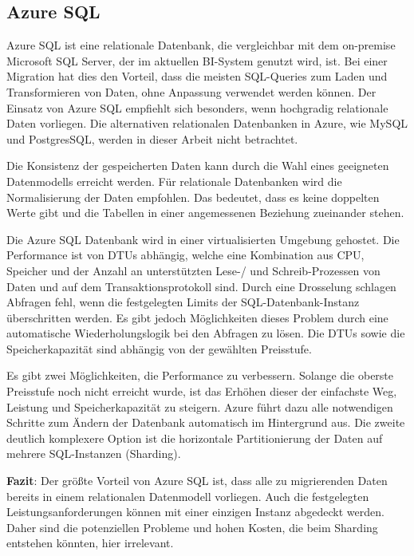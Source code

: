 \subsection{Azure SQL} \label{sec:grundlagen:azure_dienste:sql}
Azure SQL ist eine relationale Datenbank, die vergleichbar mit dem on-premise Microsoft SQL Server, der im aktuellen BI-System genutzt wird, ist. Bei einer Migration hat dies den Vorteil, dass die meisten SQL-Queries zum Laden und Transformieren von Daten, ohne Anpassung verwendet werden können. Der Einsatz von Azure SQL empfiehlt sich besonders, wenn hochgradig relationale Daten vorliegen. Die alternativen relationalen Datenbanken in Azure, wie MySQL und PostgresSQL, werden in dieser Arbeit nicht betrachtet.

Die Konsistenz der gespeicherten Daten kann durch die Wahl eines geeigneten Datenmodells erreicht werden. Für relationale Datenbanken wird die Normalisierung der Daten empfohlen. Das bedeutet, dass es keine doppelten Werte gibt und die Tabellen in einer angemessenen Beziehung zueinander stehen.

Die Azure SQL Datenbank wird in einer virtualisierten Umgebung gehostet. Die Performance ist von DTUs abhängig, welche eine Kombination aus CPU, Speicher und der Anzahl an unterstützten Lese-/ und Schreib-Prozessen von Daten und auf dem Transaktionsprotokoll sind. Durch eine Drosselung schlagen Abfragen fehl, wenn die festgelegten Limits der SQL-Datenbank-Instanz überschritten werden. Es gibt jedoch Möglichkeiten dieses Problem durch eine automatische Wiederholungslogik bei den Abfragen zu lösen. Die DTUs sowie die Speicherkapazität sind abhängig von der gewählten Preisstufe.

Es gibt zwei Möglichkeiten, die Performance zu verbessern. Solange die oberste Preisstufe noch nicht erreicht wurde, ist das Erhöhen dieser der einfachste Weg, Leistung und Speicherkapazität zu steigern. Azure führt dazu alle notwendigen Schritte zum Ändern der Datenbank automatisch im Hintergrund aus. Die zweite deutlich komplexere Option ist die horizontale Partitionierung der Daten auf mehrere SQL-Instanzen (Sharding). \cite{reagan_azure_2018}

\textbf{Fazit}: Der größte Vorteil von Azure SQL ist, dass alle zu migrierenden Daten bereits in einem relationalen Datenmodell vorliegen. Auch die festgelegten Leistungsanforderungen können mit einer einzigen Instanz abgedeckt werden. Daher sind die potenziellen Probleme und hohen Kosten, die beim Sharding entstehen könnten, hier irrelevant.

